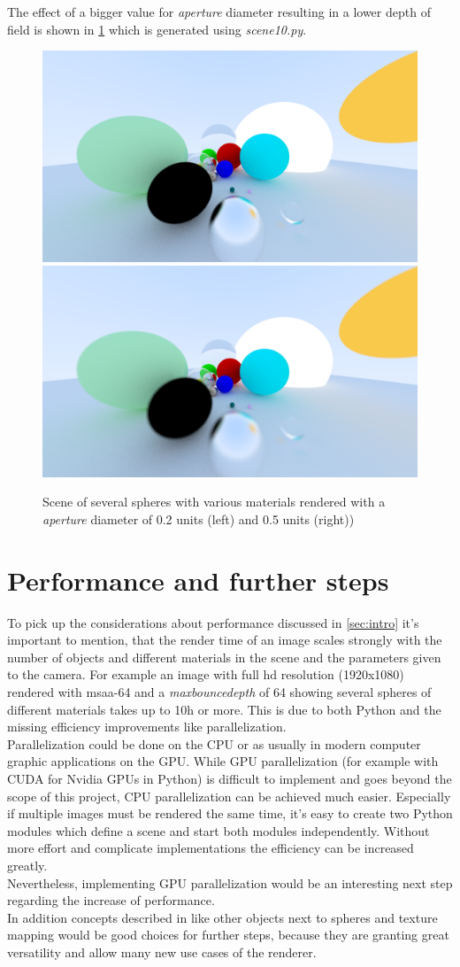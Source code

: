\documentclass[]{article}
\begin{document}
			The effect of a bigger value for \emph{aperture} diameter resulting in a lower depth of field is shown in \cref{fig:image10} which is generated using \emph{scene10.py}.
			
			\begin{figure}[h]
				\centering
				\includegraphics[width=0.45\linewidth]{image10}
				\includegraphics[width=0.45\linewidth]{image10-2}
				\caption{Scene of several spheres with various materials rendered with a \emph{aperture} diameter of 0.2 units (left) and 0.5 units (right))}
				\label{fig:image10}
			\end{figure}			
		
	\section{Performance and further steps}
		\label{sec:performance}
		To pick up the considerations about performance discussed in \cref{sec:intro} it's important to mention, that the render time of an image scales strongly with the number of objects and different materials in the scene and the parameters given to the camera. For example an image with full hd resolution (1920x1080) rendered with \ac{msaa}-64 and a \emph{max\textunderscore bounce\textunderscore depth} of 64 showing several spheres of different materials takes up to 10h or more. This is due to both Python and the missing efficiency improvements like parallelization. 
		\\
		Parallelization could be done on the CPU or as usually in modern computer graphic applications on the GPU. While GPU parallelization (for example with CUDA for Nvidia GPUs in Python) is difficult to implement and goes beyond the scope of this project, CPU parallelization can be achieved much easier. Especially if multiple images must be rendered the same time, it's easy to create two Python modules which define a scene and start both modules independently. Without more effort and complicate implementations the efficiency can be increased greatly.
		\\
		Nevertheless, implementing GPU parallelization would be an interesting next step regarding the increase of performance.
		\\
		In addition concepts described in \cite{Shirley2020RTW2} like other objects next to spheres and texture mapping would be good choices for further steps, because they are granting great versatility and allow many new use cases of the renderer.	
		
\end{document}

